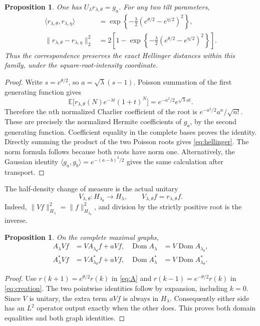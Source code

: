 \documentclass[11pt]{article}
\newtheorem{proposition}[theorem]{Proposition}
\newcommand{\E}{\mathbb E}\newcommand{\Ent}{\operatorname{Ent}}
\newcommand{\Dom}{\operatorname{Dom}}
\begin{document}
\begin{proposition}\label{prop:root}
One has $U_\lambda r_{\lambda,\theta}=g_a$. For any two tilt parameters,
\begin{align}
 \langle r_{\lambda,\theta},r_{\lambda,\eta}\rangle
 &=\exp\!\left\{-\tfrac\lambda2(e^{\theta/2}-e^{\eta/2})^2\right\},
 \label{eq:hellinger}\\
 \|r_{\lambda,\theta}-r_{\lambda,\eta}\|_2^2
 &=2\left[1-\exp\!\left\{-\tfrac\lambda2
 (e^{\theta/2}-e^{\eta/2})^2\right\}\right].\nonumber
\end{align}
Thus the correspondence preserves the exact Hellinger distances within
this family, under the square-root-intensity coordinate.
\end{proposition}
\begin{proof}
Write $s=e^{\theta/2}$, so $a=\sqrt\lambda(s-1)$.
Poisson summation of the first generating function gives
\[
 \E\big[r_{\lambda,\theta}(N)e^{-\lambda t}(1+t)^N\big]
 =e^{-a^2/2}e^{\sqrt\lambda a t}.
\]
Therefore the $n$th normalized Charlier coefficient of the root is
$e^{-a^2/2}a^n/\sqrt{n!}$. These are precisely the normalized Hermite
coefficients of $g_a$, by the second generating function. Coefficient
equality in the complete bases proves the identity. Directly summing
the product of the two Poisson roots gives \eqref{eq:hellinger}.
The norm formula follows because both roots have norm one. Alternatively,
the Gaussian identity $\langle g_a,g_b\rangle=e^{-(a-b)^2/2}$ gives
the same calculation after transport.
\end{proof}

The half-density change of measure is the actual unitary
\begin{equation}\label{eq:gauge}
 V_{\lambda,\theta}:H_{\lambda_\theta}\longrightarrow H_\lambda,
 \qquad V_{\lambda,\theta}f=r_{\lambda,\theta}f.
\end{equation}
Indeed, $\|Vf\|_{H_\lambda}^2=\|f\|_{H_{\lambda_\theta}}^2$,
and division by the strictly positive root is the inverse.

\begin{proposition}\label{prop:gauge}
On the complete maximal graphs,
\begin{align}
 A_\lambda Vf&=V A_{\lambda_\theta}f+aVf,
 &\Dom A_\lambda&=V\Dom A_{\lambda_\theta},\label{eq:gaugeA}\\
 A_\lambda^*Vf&=V A_{\lambda_\theta}^*f+aVf,
 &\Dom A_\lambda^*&=V\Dom A_{\lambda_\theta}^*.
 \label{eq:gaugecreation}
\end{align}
\end{proposition}
\begin{proof}
Use $r(k+1)=e^{\theta/2}r(k)$ in \eqref{eq:A} and
$r(k-1)=e^{-\theta/2}r(k)$ in \eqref{eq:creation}.
The two pointwise identities follow by expansion, including $k=0$.
Since $V$ is unitary, the extra term $aVf$ is always in $H_\lambda$.
Consequently either side has an $L^2$ operator output exactly when the
other does. This proves both domain equalities and both graph identities.
\end{proof}
\end{document}
